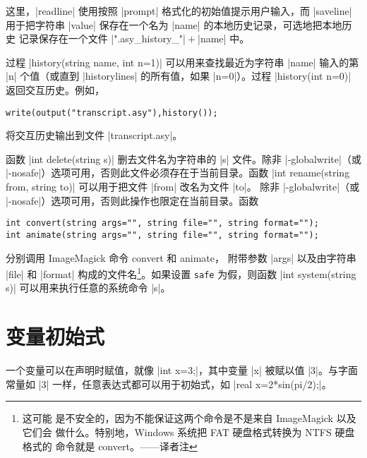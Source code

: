 \documentclass{ctexbook}
\newcommand*\prgname[1]{\textsf{#1}}
\newcommand\transnote[1]{\footnote{#1——译者注}}
\begin{document}
这里，|readline| 使用按照 |prompt| 格式化的初始值提示用户输入，而 |saveline|
用于把字符串 |value| 保存在一个名为 |name| 的本地历史记录，可选地把本地历史
记录保存在一个文件 |".asy_history_"|${}+{}$|name| 中。

过程 |history(string name, int n=1)| 可以用来查找最近为字符串 |name| 输入的第
|n| 个值（或直到 |historylines| 的所有值，如果 |n=0|）。过程
|history(int n=0)| 返回交互历史。例如，
\begin{lstlisting}
write(output("transcript.asy"),history());
\end{lstlisting}
将交互历史输出到文件 |transcript.asy|。

函数 |int delete(string s)| 删去文件名为字符串的 |s| 文件。除非
|-globalwrite|（或 |-nosafe|）选项可用，否则此文件必须存在于当前目录。函数
|int rename(string from, string to)| 可以用于把文件 |from| 改名为文件 |to|。
除非 |-globalwrite|（或 |-nosafe|）选项可用，否则此操作也限定在当前目录。函数
\begin{lstlisting}
int convert(string args="", string file="", string format="");
int animate(string args="", string file="", string format="");
\end{lstlisting}
分别调用 \prgname{ImageMagick} 命令 \prgname{convert} 和 \prgname{animate}，
附带参数 |args| 以及由字符串 |file| 和 |format| 构成的文件名\transnote{这可能
是不安全的，因为不能保证这两个命令是不是来自 \prgname{ImageMagick} 以及它们会
做什么。特别地，\prgname{Windows} 系统把 FAT 硬盘格式转换为 NTFS 硬盘格式的
命令就是 \prgname{convert}。}。如果设置 \verb=safe= 为假，则函数
|int system(string s)| 可以用来执行任意的系统命令 |s|。



\section{变量初始式}
\label{sec:initializers}


一个变量可以在声明时赋值，就像 |int x=3;|，其中变量 |x| 被赋以值 |3|。与字面
常量如 |3| 一样，任意表达式都可以用于初始式，如 |real x=2*sin(pi/2);|。
\end{document}
